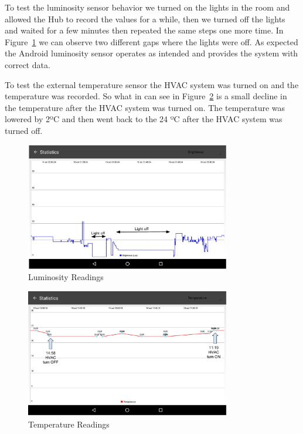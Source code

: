 To test the luminosity sensor behavior we turned on the lights in the room and allowed the Hub to record the values for a while, then we turned off the lights and waited for a few minutes then repeated the same steps one more time. In Figure~\ref{eval:lights} we can observe two different gaps where the lights were off. As expected the Android luminosity sensor operates as intended and provides the system with correct data. 

To test the external temperature sensor the HVAC system was turned on and the temperature was recorded. So what in can see in Figure~\ref{eval:temp} is a small decline in the temperature after the HVAC system was turned on. The temperature was lowered by 2ºC and then went back to the 24 ºC after the HVAC system was turned off.

\begin{figure}[h]
\centering
\includegraphics[width=0.8\textwidth]{Figures/eval_lights}
\caption{Luminosity Readings}
\label{eval:lights}
\end{figure}

\begin{figure}[h]
\centering
\includegraphics[width=0.8\textwidth]{Figures/eval_temp}
\caption{Temperature Readings}
\label{eval:temp}
\end{figure}


